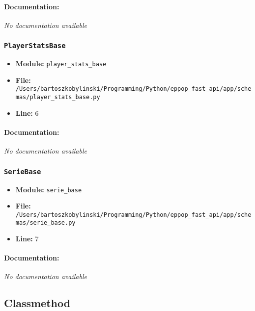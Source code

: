 \documentclass[11pt,a4paper]{article}
\begin{document}
\paragraph{Documentation:} \textit{No documentation available}


\vspace{1em}
\subsubsection{\texttt{PlayerStatsBase}}

\begin{itemize}
    \item \textbf{Module:} \texttt{player\_stats\_base}
    \item \textbf{File:} \texttt{/Users/bartoszkobylinski/Programming/Python/eppop\_fast\_api/app/schemas/player\_stats\_base.py}
    \item \textbf{Line:} 6
\end{itemize}

\paragraph{Documentation:} \textit{No documentation available}


\vspace{1em}
\subsubsection{\texttt{SerieBase}}

\begin{itemize}
    \item \textbf{Module:} \texttt{serie\_base}
    \item \textbf{File:} \texttt{/Users/bartoszkobylinski/Programming/Python/eppop\_fast\_api/app/schemas/serie\_base.py}
    \item \textbf{Line:} 7
\end{itemize}

\paragraph{Documentation:} \textit{No documentation available}


\vspace{1em}
\subsection{Classmethod}
\end{document}
